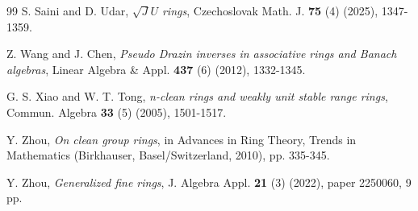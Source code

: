 \documentclass[12pt]{amsart}
\theoremstyle{definition}
\begin{document}
\begin{thebibliography}{99}
S. Saini and D. Udar, {\it $\sqrt{J}U$ rings}, Czechoslovak Math. J. \textbf{75} (4) (2025), 1347-1359.

Z. Wang and J. Chen, {\it Pseudo Drazin inverses in associative rings and Banach algebras}, Linear Algebra \& Appl. \textbf{437} (6) (2012), 1332-1345.

G. S. Xiao and W. T. Tong, {\it n-clean rings and weakly unit stable range rings}, Commun. Algebra \textbf{33} (5) (2005), 1501-1517.

Y. Zhou, {\it On clean group rings}, in Advances in Ring Theory, Trends in Mathematics (Birkhauser, Basel/Switzerland, 2010), pp. 335-345.

Y. Zhou, {\it Generalized fine rings}, J. Algebra Appl. \textbf{21} (3) (2022), paper 2250060, 9 pp.

\end{thebibliography}
\end{document}
